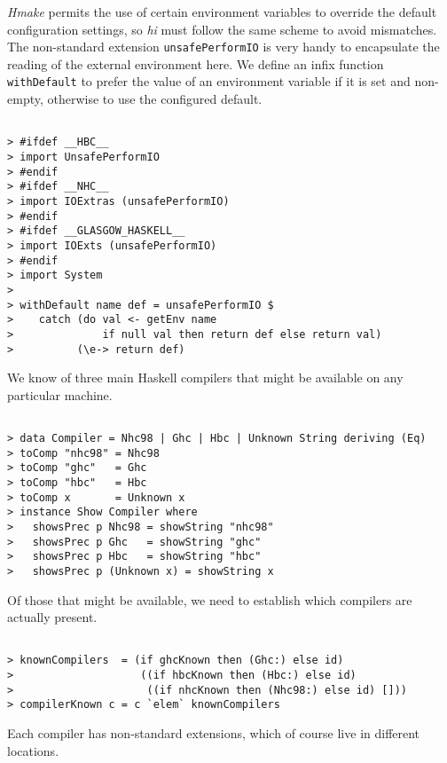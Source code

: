 \documentclass[a4paper]{article}
\begin{document}
{\em Hmake} permits the use of certain environment variables to
override the default configuration settings, so {\em hi} must
follow the same scheme to avoid mismatches.  The non-standard
extension {\tt unsafePerformIO} is very handy to encapsulate
the reading of the external environment here.  We define an infix
function {\tt withDefault} to prefer the value of an environment
variable if it is set and non-empty, otherwise to use the configured
default.

\begin{verbatim}

> #ifdef __HBC__
> import UnsafePerformIO
> #endif
> #ifdef __NHC__
> import IOExtras (unsafePerformIO)
> #endif
> #ifdef __GLASGOW_HASKELL__
> import IOExts (unsafePerformIO)
> #endif
> import System
> 
> withDefault name def = unsafePerformIO $
>    catch (do val <- getEnv name
>              if null val then return def else return val)
>          (\e-> return def)

\end{verbatim}

We know of three main Haskell compilers that might be available on
any particular machine.

\begin{verbatim}

> data Compiler = Nhc98 | Ghc | Hbc | Unknown String deriving (Eq)
> toComp "nhc98" = Nhc98
> toComp "ghc"   = Ghc
> toComp "hbc"   = Hbc
> toComp x       = Unknown x
> instance Show Compiler where
>   showsPrec p Nhc98 = showString "nhc98"
>   showsPrec p Ghc   = showString "ghc"
>   showsPrec p Hbc   = showString "hbc"
>   showsPrec p (Unknown x) = showString x

\end{verbatim}

Of those that might be available, we need to establish which compilers
are actually present.

\begin{verbatim}

> knownCompilers  = (if ghcKnown then (Ghc:) else id)
>                    ((if hbcKnown then (Hbc:) else id)
>                     ((if nhcKnown then (Nhc98:) else id) []))
> compilerKnown c = c `elem` knownCompilers

\end{verbatim}

Each compiler has non-standard extensions, which of course live
in different locations.
\end{document}
